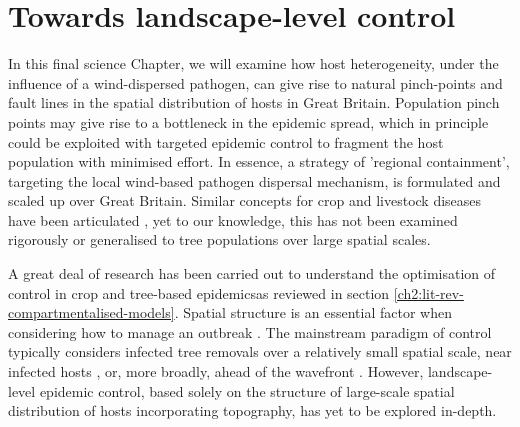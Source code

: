 
\chapter{Towards landscape-level control}


\label{ch7:landscape-level-control}

In this final science Chapter, we will examine how host heterogeneity, under the influence of a wind-dispersed pathogen, 
can give rise to natural pinch-points and fault lines in the spatial distribution of hosts in Great Britain. 
Population pinch points may give rise to a bottleneck in the epidemic spread, which in principle could be exploited with targeted epidemic control to fragment the host population with minimised effort. 
In essence, a strategy of 'regional containment', targeting the local wind-based pathogen dispersal mechanism, 
is formulated and scaled up over Great Britain.
Similar concepts for crop and livestock diseases have been articulated \cite{PAPAIX201435, GILIOLI20131, Gilligan-disease-management}, yet to our knowledge, this has not been examined rigorously or generalised to tree populations over large spatial scales.

A great deal of research has been carried out to understand the optimisation of control in crop and tree-based epidemics\textemdash as reviewed in section \ref{ch2:lit-rev-compartmentalised-models}. 
Spatial structure is an essential factor when considering how to manage an outbreak \cite{spatial-control-optimisation, control-heterogeneous-landscapes}. 
The mainstream paradigm of control typically considers infected tree removals over a relatively small spatial scale, near infected hosts \cite{WEBIDEMICS}, or, more broadly, ahead of the wavefront \cite{large-scale-control}. 
However, landscape-level epidemic control, based solely on the structure of large-scale spatial distribution of hosts incorporating topography, has yet to be explored in-depth.

